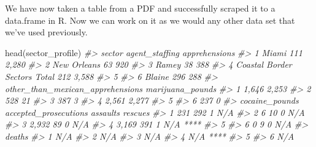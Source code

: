 \documentclass[
]{krantz}
\makeatletter
\newenvironment{Shaded}{\begin{snugshade}}{\end{snugshade}}
\newcommand{\CommentTok}[1]{\textcolor[rgb]{0.37,0.37,0.37}{\textit{#1}}}
\newcommand{\FunctionTok}[1]{\textcolor[rgb]{0,0,0}{#1}}
\newcommand{\NormalTok}[1]{#1}
\newenvironment{kframe}{%
\medskip{}
\setlength{\fboxsep}{.8em}
 \def\at@end@of@kframe{}%
 \ifinner\ifhmode%
  \def\at@end@of@kframe{\end{minipage}}%
  \begin{minipage}{\columnwidth}%
 \fi\fi%
 \def\FrameCommand##1{\hskip\@totalleftmargin \hskip-\fboxsep
 \colorbox{shadecolor}{##1}\hskip-\fboxsep
     \hskip-\linewidth \hskip-\@totalleftmargin \hskip\columnwidth}%
 \MakeFramed {\advance\hsize-\width
   \@totalleftmargin\z@ \linewidth\hsize
   \@setminipage}}%
 {\par\unskip\endMakeFramed%
 \at@end@of@kframe}
\renewenvironment{Shaded}{\begin{kframe}}{\end{kframe}}
\makeatother
\begin{document}
We have now taken a table from a PDF and successfully
scraped it to a data.frame in R. Now we can work on it as we
would any other data set that we've used previously.

\begin{Shaded}
\begin{Highlighting}[]
\FunctionTok{head}\NormalTok{(sector\_profile)}
\CommentTok{\#\textgreater{}                         sector agent\_staffing apprehensions}
\CommentTok{\#\textgreater{} 1                        Miami            111         2,280}
\CommentTok{\#\textgreater{} 2                  New Orleans             63           920}
\CommentTok{\#\textgreater{} 3                        Ramey             38           388}
\CommentTok{\#\textgreater{} 4 Coastal Border Sectors Total            212         3,588}
\CommentTok{\#\textgreater{} 5                                                          }
\CommentTok{\#\textgreater{} 6                       Blaine            296           288}
\CommentTok{\#\textgreater{}   other\_than\_mexican\_apprehensions marijuana\_pounds}
\CommentTok{\#\textgreater{} 1                            1,646            2,253}
\CommentTok{\#\textgreater{} 2                              528               21}
\CommentTok{\#\textgreater{} 3                              387                3}
\CommentTok{\#\textgreater{} 4                            2,561            2,277}
\CommentTok{\#\textgreater{} 5                                                  }
\CommentTok{\#\textgreater{} 6                              237                0}
\CommentTok{\#\textgreater{}   cocaine\_pounds accepted\_prosecutions assaults  rescues}
\CommentTok{\#\textgreater{} 1            231                   292        1      N/A}
\CommentTok{\#\textgreater{} 2              6                    10        0      N/A}
\CommentTok{\#\textgreater{} 3          2,932                    89        0      N/A}
\CommentTok{\#\textgreater{} 4          3,169                   391        1 N/A ****}
\CommentTok{\#\textgreater{} 5                                                       }
\CommentTok{\#\textgreater{} 6              0                     9        0      N/A}
\CommentTok{\#\textgreater{}     deaths}
\CommentTok{\#\textgreater{} 1      N/A}
\CommentTok{\#\textgreater{} 2      N/A}
\CommentTok{\#\textgreater{} 3      N/A}
\CommentTok{\#\textgreater{} 4 N/A ****}
\CommentTok{\#\textgreater{} 5         }
\CommentTok{\#\textgreater{} 6      N/A}
\end{Highlighting}
\end{Shaded}
\end{document}

